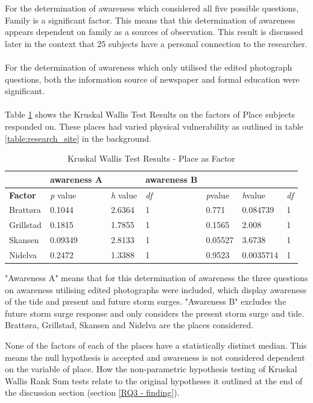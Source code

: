 For the determination of awareness which considered all five possible questions, Family is a significant factor. This means that this determination of awareness appears dependent on family as a sources of observation. This result is discussed later in the context that 25 subjects have a personal connection to the researcher.
\paragraph{}
For the determination of awareness which only utilised the edited photograph questions, both the information source of newspaper and formal education were significant.
\paragraph{}
Table \ref{kwtest_place} shows the Kruskal Wallis Test Results on the factors of Place subjects responded on. These places had varied physical vulnerability as outlined in table \ref{table:research_site} in the background.

\begin{table}[H]
    \centering
    \begin{tabular}{|l|l|l|l|l|l|l|}
    \hline

   
 ~ & \textbf{awareness A} & ~ & \textbf{awareness B} & ~ & ~ &\\\hline
        \textbf{Factor} &\textit{p} value &\textit{h} value & \textit{df} &\textit{p}value &\textit{h}value & \textit{df}\\ \hline
         Brattøra & 0.1044  & 2.6364 & 1 & 0.771 & 0.084739 &1\\ \hline
        Grillstad & 0.1815 & 1.7855 & 1 & 0.1565 & 2.008 & 1 \\ \hline
       Skansen & 0.09349 & 2.8133 & 1 & 0.05527 & 3.6738 & 1\\ \hline
         Nidelva & 0.2472 & 1.3388 & 1 & 0.9523 &  0.0035714 & 1\\ \hline
    \end{tabular}
    \caption{Kruskal Wallis Test Results - Place as Factor}{ "Awareness A" means that for this determination of awareness the three questions on awareness utilising edited photographs were included, which display awareness of the tide and present and future storm surges.  "Awareness B" excludes the future storm surge response and only considers the present storm surge and tide.  Brattøra, Grillstad, Skansen and Nidelva are the places considered.}
    \label{kwtest_place}
\end{table}
None of the factors of each of the places have a statistically distinct median. This means the null hypothesis is accepted and awareness is not considered dependent on the variable of place. 
  How the non-parametric hypothesis testing of Kruskal Wallis Rank Sum tests relate to the original hypotheses it outlined at the end of the discussion section (section \ref{RQ3 - finding}).   
\paragraph{}

  









